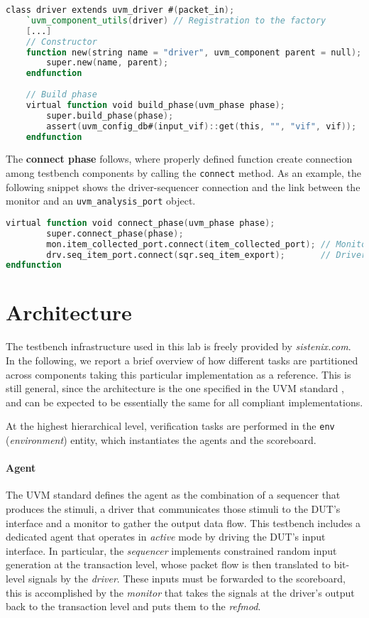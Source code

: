 \begin{lstlisting}[language=verilog, label=driver]
class driver extends uvm_driver #(packet_in);
	`uvm_component_utils(driver) // Registration to the factory
	[...]
	// Constructor
	function new(string name = "driver", uvm_component parent = null);
		super.new(name, parent);
	endfunction
	
	// Build phase
	virtual function void build_phase(uvm_phase phase);
		super.build_phase(phase);
		assert(uvm_config_db#(input_vif)::get(this, "", "vif", vif));
	endfunction
\end{lstlisting}

The \textbf{connect phase} follows, where properly defined function create connection among testbench components by calling the \texttt{connect} method. As an example, the following snippet
shows the driver-sequencer connection and the link between the monitor and an \texttt{uvm\_analysis\_port} object.

\begin{lstlisting}[language=verilog, caption=Creation phase from the agent]
 virtual function void connect_phase(uvm_phase phase);
		super.connect_phase(phase);
		mon.item_collected_port.connect(item_collected_port); // Monitor connection
		drv.seq_item_port.connect(sqr.seq_item_export);       // Driver connection with sequencer
endfunction
	\end{lstlisting}


\section{Architecture}
The testbench infrastructure used in this lab is freely provided by \textit{sistenix.com}. In the following, we report a brief overview of how different tasks are partitioned across components taking this particular implementation as a reference. This is still general, since the architecture is the one specified in the UVM standard \cite{uvm_book}, and can be expected to be essentially the same for all compliant implementations.

At the highest hierarchical level, verification tasks are performed in the \texttt{env} (\textit{environment}) entity, which instantiates the agents and the scoreboard.

\paragraph{Agent} The UVM standard defines the agent as the combination of a sequencer that produces the stimuli, a driver that communicates those stimuli to the DUT's interface and a monitor 
to gather the output data flow. This testbench includes a dedicated agent that operates in \textit{active} mode by driving the DUT's input interface. In particular, the \textit{sequencer} implements constrained random input generation at the transaction level, whose packet flow is then translated to bit-level signals by the \textit{driver}. These inputs must be forwarded to the scoreboard, this is accomplished by the \textit{monitor} that takes the signals at the driver's output back to the transaction level and puts them to the \textit{refmod}. 

